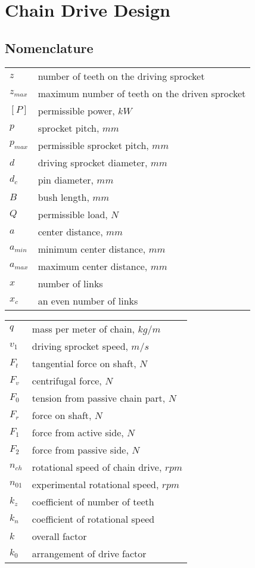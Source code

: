\chapter{Chain Drive Design}
\section{Nomenclature}
\begin{tabular}[t]{lp{7cm}}
		$ z $ & number of teeth on the driving sprocket\\
		$ z_{max} $ & maximum number of teeth on the driven sprocket\\
		$ [P] $ & permissible power, $ \unit{kW} $\\
		$ p $ & sprocket pitch, $ \unit{mm} $\\
		$ p_{max} $ & permissible sprocket pitch, $ \unit{mm} $\\
		$ d $ & driving sprocket diameter, $ \unit{mm} $\\
		$ d_c $ & pin diameter, $ \unit{mm} $\\
		$ B $ & bush length, $ \unit{mm} $\\
		$ Q $ & permissible load, $ \unit{N} $\\
		$ a $ & center distance, $ \unit{mm} $\\
		$ a_{min} $ & minimum center distance, $ \unit{mm} $\\
		$ a_{max} $ & maximum center distance, $ \unit{mm} $\\
		$ x $ & number of links\\
		$ x_c $ & an even number of links\\
\end{tabular}
\begin{tabular}[t]{lp{7cm}}	
		$ q $ & mass per meter of chain, $ \unit{kg/m} $\\
		$ v_1 $ & driving sprocket speed, $ \unit{m/s} $\\
		$ F_t $ & tangential force on shaft, $ \unit{N} $\\
		$ F_v $ & centrifugal force, $ \unit{N} $\\
		$ F_0 $ & tension from passive chain part, $ \unit{N} $\\
		$ F_r $ & force on shaft, $ \unit{N} $\\
		$ F_1 $ & force from active side, $ \unit{N} $\\
		$ F_2 $ & force from passive side, $ \unit{N} $\\
		$ n_{ch} $ & rotational speed of chain drive, $ \unit{rpm} $\\
		$ n_{01} $ & experimental rotational speed, $ \unit{rpm} $\\
		$ k_z $ & coefficient of number of teeth\\
		$ k_n $ & coefficient of rotational speed\\
		$ k $ & overall factor\\
		$ k_0 $ & arrangement of drive factor\\		
\end{tabular}\newpage
